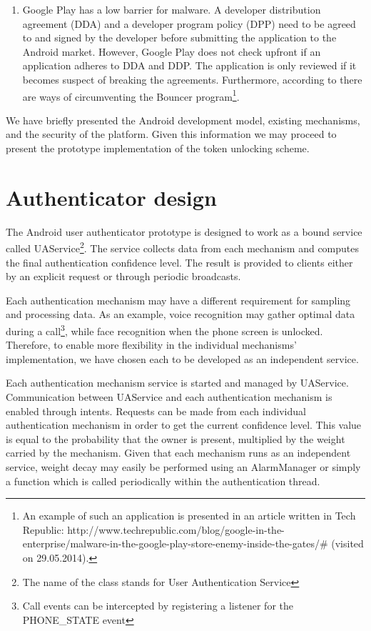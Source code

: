 \begin{enumerate}
	\item Google Play has a low barrier for malware. A developer distribution agreement (DDA) and a developer program policy (DPP) need to be agreed to and signed by the developer before submitting the application to the Android market. However, Google Play does not check upfront if an application adheres to DDA and DDP. The application is only reviewed if it becomes suspect of breaking the agreements. Furthermore, according to \cite{percoco2012adventures} there are ways of circumventing the Bouncer program\footnote{An example of such an application is presented in an article written in Tech Republic: http://www.techrepublic.com/blog/google-in-the-enterprise/malware-in-the-google-play-store-enemy-inside-the-gates/# (visited on 29.05.2014).}. 
\end{enumerate}

We have briefly presented the Android development model, existing mechanisms, and the security of the platform. Given this information we may proceed to present the prototype implementation of the token unlocking scheme. 

\section{Authenticator design}
The Android user authenticator prototype is designed to work as a bound service called UAService\footnote{The name of the class stands for User Authentication Service}. The service collects data from each mechanism and computes the final authentication confidence level. The result is provided to clients either by an explicit request or through periodic broadcasts.

Each authentication mechanism may have a different requirement for sampling and processing data. As an example, voice recognition may gather optimal data during a call\footnote{Call events can be intercepted by registering a listener for the PHONE\_STATE event}, while face recognition when the phone screen is unlocked. Therefore, to enable more flexibility in the individual mechanisms' implementation, we have chosen each to be developed as an independent service. 

Each authentication mechanism service is started and managed by UAService. Communication between UAService and each authentication mechanism is enabled through intents. Requests can be made from each individual authentication mechanism in order to get the current confidence level. This value is equal to the probability that the owner is present, multiplied by the weight carried by the mechanism. Given that each mechanism runs as an independent service, weight decay may easily be performed using an AlarmManager or simply a function which is called periodically within the authentication thread.

